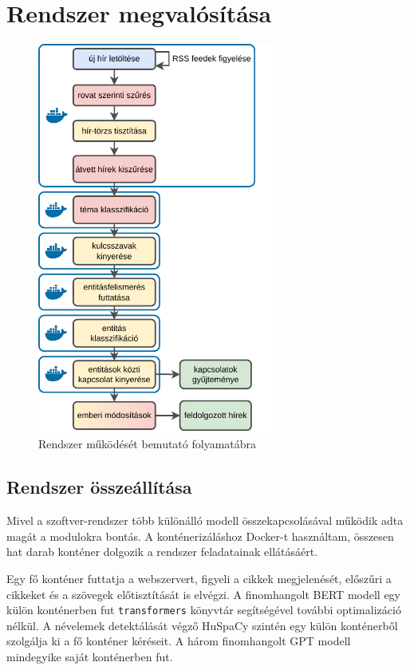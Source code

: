 \chapter{Rendszer megvalósítása}

\begin{figure}[H]
	\centering
	\includegraphics[width=80mm,keepaspectratio]{figures/flowchart-konkret.pdf}
	\caption{Rendszer működését bemutató folyamatábra}
\end{figure}

\section{Rendszer összeállítása}

Mivel a szoftver-rendszer több különálló modell összekapcsolásával működik adta magát a modulokra bontás. A konténerizáláshoz Docker-t használtam, összesen hat darab konténer dolgozik a rendszer feladatainak ellátásáért.

Egy fő konténer futtatja a webszervert, figyeli a cikkek megjelenését, előszűri a cikkeket és a szövegek előtisztítását is elvégzi. A finomhangolt BERT modell egy külön konténerben fut \texttt{transformers} könyvtár segítségével további optimalizáció nélkül. A névelemek detektálását végző HuSpaCy szintén egy külön konténerből szolgálja ki a fő konténer kéréseit. A három finomhangolt GPT modell mindegyike saját konténerben fut.

